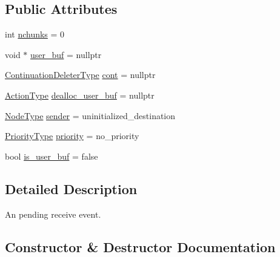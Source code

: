 \subsection*{Public Attributes}
\begin{DoxyCompactItemize}
\item 
int \hyperlink{structvt_1_1messaging_1_1_pending_recv_a81f94488ff0b51d17d09fad4db88ea37}{nchunks} = 0
\item 
void $\ast$ \hyperlink{structvt_1_1messaging_1_1_pending_recv_a18d11f650583c3da5a7362e0c998be5d}{user\+\_\+buf} = nullptr
\item 
\hyperlink{namespacevt_a6de3bd201e2a040be9362d9d24d1e446}{Continuation\+Deleter\+Type} \hyperlink{structvt_1_1messaging_1_1_pending_recv_a38dbaba9db9f4fd8d3e72553f030a21d}{cont} = nullptr
\item 
\hyperlink{namespacevt_ae0a5a7b18cc99d7b732cb4d44f46b0f3}{Action\+Type} \hyperlink{structvt_1_1messaging_1_1_pending_recv_a1d0de0586d485b2b6af7daacafa7ea0d}{dealloc\+\_\+user\+\_\+buf} = nullptr
\item 
\hyperlink{namespacevt_a866da9d0efc19c0a1ce79e9e492f47e2}{Node\+Type} \hyperlink{structvt_1_1messaging_1_1_pending_recv_a7bf339cd65c0b4caad259825eb7861d5}{sender} = uninitialized\+\_\+destination
\item 
\hyperlink{namespacevt_a86bff9f556eb761b27fc8600d006ac04}{Priority\+Type} \hyperlink{structvt_1_1messaging_1_1_pending_recv_ac532592ff86b902de3c38c971db6290e}{priority} = no\+\_\+priority
\item 
bool \hyperlink{structvt_1_1messaging_1_1_pending_recv_a232d976ea4bb28426530e8c431c52f95}{is\+\_\+user\+\_\+buf} = false
\end{DoxyCompactItemize}


\subsection{Detailed Description}
An pending receive event. 

\subsection{Constructor \& Destructor Documentation}
\mbox{\label{structvt_1_1messaging_1_1_pending_recv_ad697905a846ddb4fefb3a7b0348f3a5d}} 
